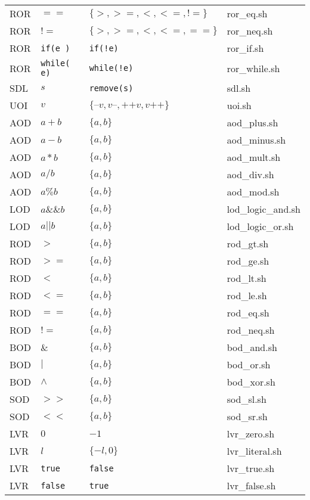 \begin{table}[h]
\begin{tabular}{|llll|}
ROR	&	$==$	&	$\{>, >=, <, <=, !=\}$	&	ror\_eq.sh \\
ROR	&	$!=$	&	$\{>, >=, <, <=, ==\}$	&	ror\_neq.sh \\
ROR	&	\texttt{if(e )}	&	\texttt{if(!e)}	&	ror\_if.sh \\
ROR	&	\texttt{while( e)}	&	\texttt{while(!e)}	&	ror\_while.sh \\
SDL	&	$s$	&	\texttt{remove(s)}	&	sdl.sh \\
UOI	&	$v$	&	$\{\texttt{--}v, v\texttt{--}, \texttt{++}v, v\texttt{++}\}$	&	uoi.sh \\
AOD	&	$a + b$	&	$\{a, b\}$	&	aod\_plus.sh \\
AOD	&	$a - b$	&	$\{a, b\}$	&	aod\_minus.sh \\
AOD	&	$a * b$	&	$\{a, b\}$	&	aod\_mult.sh \\
AOD	&	$a / b$	&	$\{a, b\}$	&	aod\_div.sh \\
AOD	&	$a \% b$	&	$\{a, b\}$	&	aod\_mod.sh \\
LOD	&	$a \&\& b$	&	$\{a, b\}$	&	lod\_logic\_and.sh \\
LOD	&	$a || b$	&	$\{a, b\}$	&	lod\_logic\_or.sh \\
ROD	&	$>$	&	$\{a, b\}$	&	rod\_gt.sh \\
ROD	&	$>=$	&	$\{a, b\}$	&	rod\_ge.sh \\
ROD	&	$<$	&	$\{a, b\}$	&	rod\_lt.sh \\
ROD	&	$<=$	&	$\{a, b\}$	&	rod\_le.sh \\
ROD	&	$==$	&	$\{a, b\}$	&	rod\_eq.sh \\
ROD	&	$!=$	&	$\{a, b\}$	&	rod\_neq.sh \\
BOD	&	$\&$	&	$\{a, b\}$	&	bod\_and.sh \\
BOD	&	$|$	&	$\{a, b\}$	&	bod\_or.sh \\
BOD	&	$\land$	&	$\{a, b\}$	&	bod\_xor.sh \\
SOD	&	$>>$	&	$\{a, b\}$	&	sod\_sl.sh \\
SOD	&	$<<$	&	$\{a, b\}$	&	sod\_sr.sh \\
LVR	&	$0$	&	$-1$	&	lvr\_zero.sh \\
LVR	&	$l$	&	$\{-l, 0\}$	&	lvr\_literal.sh \\
LVR	&	\texttt{true}	&	\texttt{false}	&	lvr\_true.sh \\
LVR	&	\texttt{false}	&	\texttt{true}	&	lvr\_false.sh \\
\hline
\end{tabular}
\end{table}